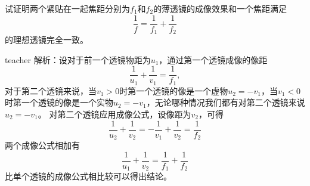 \begin{example}
	试证明两个紧贴在一起焦距分别为$f_1$和$f_2$的薄透镜的成像效果和一个焦距满足
	\[\frac{1}{f}=\frac{1}{f_1}+\frac{1}{f_2}\]
	的理想透镜完全一致。
	\begin{taggedblock}{teacher}
		\newline
		解析：设对于前一个透镜物距为$u_1$，通过第一个透镜成像的像距
		\[
		\frac{1}{u_1}+\frac{1}{v_1}=\frac{1}{f_1},
		\]
		对于第二个透镜来说，当$v_1>0$时第一个透镜的像是一个虚物$u_2=-v_1$，当$v_1<0$时第一个透镜的像是一个实物$u_2=-v_1$，无论哪种情况我们都有对第二个透镜来说$u_2=-v_1$。
		对第二个透镜应用成像公式，设像距为$v_2$，可得
		\[
		\frac{1}{u_2}+\frac{1}{v_2}=-\frac{1}{v_1}+\frac{1}{v_2}=\frac{1}{f_2}
		\]
		两个成像公式相加有
		\[\frac{1}{u_1}+\frac{1}{v_2}=\frac{1}{f_1}+\frac{1}{f_2}\]
		比单个透镜的成像公式相比较可以得出结论。
		
		
		
	\end{taggedblock}
\end{example}


